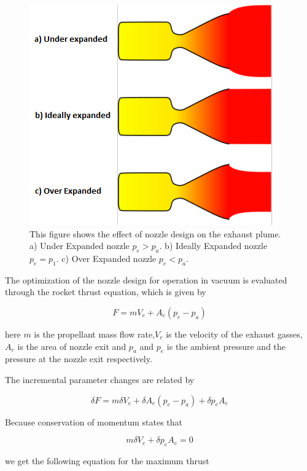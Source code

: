 \begin{figure}
\begin{center}
\includegraphics[scale=0.8]{figures/nozzle.png}
\caption{This figure shows the effect of nozzle design on the exhaust plume. a) Under Expanded nozzle $p_e>p_a$. b) Ideally Expanded nozzle $p_e=p_1$. c) Over Expanded nozzle $p_e<p_a$. }
\label{jetflows}
\end{center}
\end{figure}

The optimization of the nozzle design for operation in vacuum is evaluated through the rocket thrust equation, which is given by \cite{spacecraft}

\begin{equation}
F=mV_e+A_e(p_e-p_a)
\end{equation}

here $m$ is the propellant mass flow rate,$V_e$ is the velocity of the exhaust gasses, $A_e$ is the area of nozzle exit and $p_a$ and $p_e$ is the ambient pressure and the pressure at the nozzle exit respectively. 

The incremental parameter changes are related by

\begin{equation}
\delta F=m\delta V_e +\delta A_e(p_e-p_a) +\delta p_e A_e
\end{equation}

Because conservation of momentum states that 

\begin{equation}
m\delta V_e+\delta p_e A_e=0
\end{equation}

we get the following equation for the maximum thrust

